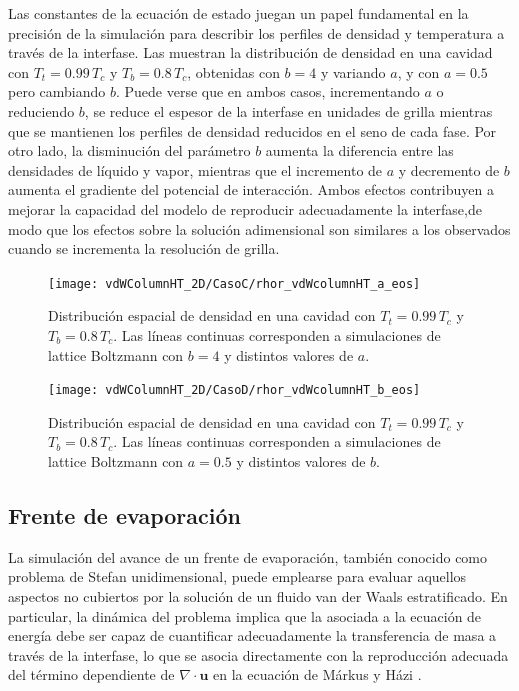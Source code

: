 Las constantes de la ecuaci\'on de estado juegan un papel fundamental en la precisi\'on de la simulaci\'on para describir los perfiles de densidad y temperatura a trav\'es de la interfase. Las  muestran la distribuci\'on de densidad en una cavidad con $T_t = 0.99 \, T_c$ y $T_b = 0.8 \, T_c$, obtenidas con $b=4$ y variando $a$, y con $a=0.5$ pero cambiando $b$. Puede verse que en ambos casos, incrementando $a$ o reduciendo $b$, se reduce el espesor de la interfase en unidades de grilla mientras que se mantienen los perfiles de densidad reducidos en el seno de cada fase. Por otro lado, la disminuci\'on del par\'ametro $b$ aumenta la diferencia entre las densidades de l\'iquido y vapor, mientras que el incremento de $a$ y decremento de $b$ aumenta el gradiente del potencial de interacci\'on. Ambos efectos contribuyen a mejorar la capacidad del modelo \pp{} de reproducir adecuadamente la interfase,de modo que los efectos sobre la soluci\'on adimensional son similares a los observados cuando se incrementa la resoluci\'on de grilla.

\begin{figure}[ht]
	\centering
	\texttt{[image: vdWColumnHT\_2D/CasoC/rhor\_vdWcolumnHT\_a\_eos]}
	\caption{Distribuci\'on espacial de densidad en una cavidad con $T_t = 0.99 \, T_c$ y $T_b = 0.8 \, T_c$. Las l\'ineas continuas corresponden a simulaciones de lattice Boltzmann con $b=4$ y distintos valores de $a$.}
	\label{fig:vdWColumnHT_rhor_a_eos_3D}
\end{figure}

\begin{figure}[ht]
	\centering
	\texttt{[image: vdWColumnHT\_2D/CasoD/rhor\_vdWcolumnHT\_b\_eos]}
	\caption{Distribuci\'on espacial de densidad en una cavidad con $T_t = 0.99 \, T_c$ y $T_b = 0.8 \, T_c$. Las l\'ineas continuas corresponden a simulaciones de lattice Boltzmann con $a=0.5$ y distintos valores de $b$.}
	\label{fig:vdWColumnHT_rhor_b_eos_3D}
\end{figure}




\subsection{Frente de evaporaci\'on}

La simulaci\'on del avance de un frente de evaporaci\'on, tambi\'en conocido como problema de Stefan unidimensional, puede emplearse para evaluar aquellos aspectos no cubiertos por la soluci\'on de un fluido van der Waals estratificado. En particular, la din\'amica del problema implica que la \lbe{} asociada a la ecuaci\'on de energ\'ia debe ser capaz de cuantificar adecuadamente la transferencia de masa a trav\'es de la interfase, lo que se asocia directamente con la reproducci\'on adecuada del t\'ermino dependiente de $\nabla \cdot \bm{u}$ en la ecuaci\'on de M\'arkus y H\'azi \cite{safari_consistent_2014}.

